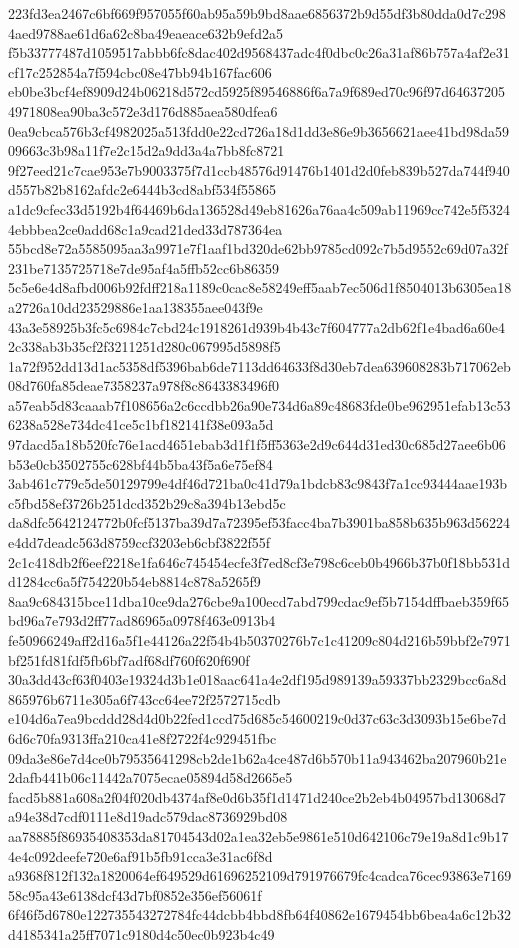 \documentclass[11pt,a4paper]{article}
\begin{document}
{223fd3ea2467c6bf669f957055f60ab95a59b9bd8aae6856372b9d55df3b80dda0d7c2984aed9788ae61d6a62c8ba49eaeace632b9efd2a5
f5b33777487d1059517abbb6fc8dac402d9568437adc4f0dbc0c26a31af86b757a4af2e31cf17c252854a7f594cbc08e47bb94b167fac606
eb0be3bcf4ef8909d24b06218d572cd5925f89546886f6a7a9f689ed70c96f97d646372054971808ea90ba3c572e3d176d885aea580dfea6
0ea9cbca576b3cf4982025a513fdd0e22cd726a18d1dd3e86e9b3656621aee41bd98da5909663c3b98a11f7e2c15d2a9dd3a4a7bb8fc8721
9f27eed21c7cae953e7b9003375f7d1ccb48576d91476b1401d2d0feb839b527da744f940d557b82b8162afdc2e6444b3cd8abf534f55865
a1dc9cfec33d5192b4f64469b6da136528d49eb81626a76aa4c509ab11969cc742e5f53244ebbbea2ce0add68c1a9cad21ded33d787364ea
55bcd8e72a5585095aa3a9971e7f1aaf1bd320de62bb9785cd092c7b5d9552c69d07a32f231be7135725718e7de95af4a5ffb52cc6b86359
5c5e6e4d8afbd006b92fdff218a1189c0cac8e58249eff5aab7ec506d1f8504013b6305ea18a2726a10dd23529886e1aa138355aee043f9e
43a3e58925b3fc5c6984c7cbd24c1918261d939b4b43c7f604777a2db62f1e4bad6a60e42c338ab3b35cf2f3211251d280c067995d5898f5
1a72f952dd13d1ac5358df5396bab6de7113dd64633f8d30eb7dea639608283b717062eb08d760fa85deae7358237a978f8c8643383496f0
a57eab5d83caaab7f108656a2c6ccdbb26a90e734d6a89c48683fde0be962951efab13c536238a528e734dc41ce5c1bf182141f38e093a5d
97dacd5a18b520fc76e1acd4651ebab3d1f1f5ff5363e2d9c644d31ed30c685d27aee6b06b53e0cb3502755c628bf44b5ba43f5a6e75ef84
3ab461c779c5de50129799e4df46d721ba0c41d79a1bdcb83c9843f7a1cc93444aae193bc5fbd58ef3726b251dcd352b29c8a394b13ebd5c
da8dfc5642124772b0fcf5137ba39d7a72395ef53facc4ba7b3901ba858b635b963d56224e4dd7deadc563d8759ccf3203eb6cbf3822f55f
2c1c418db2f6eef2218e1fa646c745454ecfe3f7ed8cf3e798c6ceb0b4966b37b0f18bb531dd1284cc6a5f754220b54eb8814c878a5265f9
8aa9c684315bce11dba10ce9da276cbe9a100ecd7abd799cdac9ef5b7154dffbaeb359f65bd96a7e793d2ff77ad86965a0978f463e0913b4
fe50966249aff2d16a5f1e44126a22f54b4b50370276b7c1c41209c804d216b59bbf2e7971bf251fd81fdf5fb6bf7adf68df760f620f690f
30a3dd43cf63f0403e19324d3b1e018aac641a4e2df195d989139a59337bb2329bcc6a8d865976b6711e305a6f743cc64ee72f2572715cdb
e104d6a7ea9bcddd28d4d0b22fed1ccd75d685c54600219c0d37c63c3d3093b15e6be7d6d6c70fa9313ffa210ca41e8f2722f4c929451fbc
09da3e86e7d4ce0b79535641298cb2de1b62a4ce487d6b570b11a943462ba207960b21e2dafb441b06c11442a7075ecae05894d58d2665e5
facd5b881a608a2f04f020db4374af8e0d6b35f1d1471d240ce2b2eb4b04957bd13068d7a94e38d7cdf0111e8d19adc579dac8736929bd08
aa78885f86935408353da81704543d02a1ea32eb5e9861e510d642106c79e19a8d1c9b174e4c092deefe720e6af91b5fb91cca3e31ac6f8d
a9368f812f132a1820064ef649529d61696252109d791976679fc4cadca76cec93863e716958c95a43e6138dcf43d7bf0852e356ef56061f
6f46f5d6780e122735543272784fc44dcbb4bbd8fb64f40862e1679454bb6bea4a6c12b32d4185341a25ff7071c9180d4c50ec0b923b4c49
}
\end{document}
